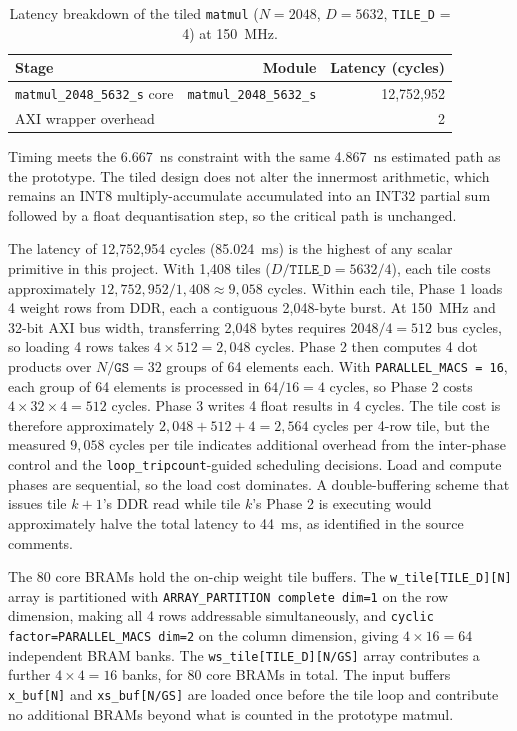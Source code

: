 \begin{table}[H]
  \centering
  \begin{tabular}{lrr}
    \toprule
    Stage & Module & Latency (cycles) \\
    \midrule
    \texttt{matmul\_2048\_5632\_s} core & \texttt{matmul\_2048\_5632\_s} & 12{,}752{,}952 \\
    AXI wrapper overhead & & 2 \\
    \bottomrule
  \end{tabular}
  \caption{Latency breakdown of the tiled \texttt{matmul}
           ($N = 2048$, $D = 5632$, \texttt{TILE\_D} = 4) at
           \SI{150}{\mega\hertz}.}
  \label{tab:matmul_u3_latency}
\end{table}

Timing meets the \SI{6.667}{\nano\second} constraint with the same
\SI{4.867}{\nano\second} estimated path as the prototype. The tiled
design does not alter the innermost arithmetic, which remains an INT8
multiply-accumulate accumulated into an INT32 partial sum followed by
a float dequantisation step, so the critical path is unchanged.

The latency of 12{,}752{,}954 cycles (\SI{85.024}{\milli\second}) is the
highest of any scalar primitive in this project. With 1{,}408 tiles
($D/\texttt{TILE\_D} = 5632/4$), each tile costs approximately
$12{,}752{,}952 / 1{,}408 \approx 9{,}058$ cycles. Within each tile,
Phase 1 loads 4 weight rows from DDR, each a contiguous 2{,}048-byte
burst. At \SI{150}{\mega\hertz} and 32-bit AXI bus width, transferring
2{,}048 bytes requires $2048/4 = 512$ bus cycles, so loading 4 rows
takes $4 \times 512 = 2{,}048$ cycles. Phase 2 then computes 4 dot
products over $N/\texttt{GS} = 32$ groups of 64 elements each.
With \texttt{PARALLEL\_MACS\,=\,16}, each group of 64 elements is
processed in $64/16 = 4$ cycles, so Phase 2 costs $4 \times 32 \times 4 =
512$ cycles. Phase 3 writes 4 float results in 4 cycles. The tile cost
is therefore approximately $2{,}048 + 512 + 4 = 2{,}564$ cycles per
4-row tile, but the measured $9{,}058$ cycles per tile indicates
additional overhead from the inter-phase control and the
\texttt{loop\_tripcount}-guided scheduling decisions. Load and compute
phases are sequential, so the load cost dominates. A double-buffering
scheme that issues tile $k+1$'s DDR read while tile $k$'s Phase 2 is
executing would approximately halve the total latency to
\SI{44}{\milli\second}, as identified in the source comments.

The 80 core BRAMs hold the on-chip weight tile buffers. The
\texttt{w\_tile[TILE\_D][N]} array is partitioned with
\texttt{ARRAY\_PARTITION complete dim=1} on the row dimension, making all
4 rows addressable simultaneously, and \texttt{cyclic
factor=PARALLEL\_MACS dim=2} on the column dimension, giving
$4 \times 16 = 64$ independent BRAM banks. The
\texttt{ws\_tile[TILE\_D][N/GS]} array contributes a further
$4 \times 4 = 16$ banks, for 80 core BRAMs in total. The input buffers
\texttt{x\_buf[N]} and \texttt{xs\_buf[N/GS]} are loaded once before
the tile loop and contribute no additional BRAMs beyond what is counted
in the prototype matmul.

